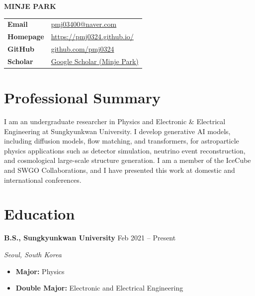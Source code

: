 \documentclass[11pt, a4paper]{article}
\newcommand{\experienceitem}[4]{
    \begin{tcolorbox}[
        colback=lightgray,
        colframe=primary,
        boxrule=0pt,
        leftrule=3pt,
        arc=0pt,
        left=5pt,
        right=5pt,
        top=5pt,
        bottom=5pt
    ]
    \textbf{\large #1} \hfill {\color{primary}#2}
    
    \textit{#3}
    
    #4
    \end{tcolorbox}
    \vspace{3pt}
}
\begin{document}
\vspace{-6pt}

{\Huge\bfseries\color{primary} MINJE PARK}

\vspace{4pt}
\noindent
\begin{tabularx}{\textwidth}{@{}>{\bfseries}p{}X@{}}
Email &
\href{mailto:pmj03400@naver.com}{pmj03400@naver.com} \\
Homepage &
\href{https://pmj0324.github.io/}{https://pmj0324.github.io/} \\
GitHub &
\href{https://github.com/pmj0324}{github.com/pmj0324} \\
Scholar &
\href{https://scholar.google.com/citations?user=oC5mE0AAAAAJ}{Google Scholar (Minje Park)} \\
\end{tabularx}

\vspace{2pt}

\section{Professional Summary}

\vspace{3pt}

I am an undergraduate researcher in Physics and Electronic \& Electrical Engineering at Sungkyunkwan University. I develop generative AI models, including diffusion models, flow matching, and transformers, for astroparticle physics applications such as detector simulation, neutrino event reconstruction, and cosmological large-scale structure generation. I am a member of the IceCube and SWGO Collaborations, and I have presented this work at domestic and international conferences.

\section{Education}
\experienceitem{B.S., Sungkyunkwan University}{Feb 2021 -- Present}{Seoul, South Korea}{
    \begin{itemize}[leftmargin=*, itemsep=2pt]
        \item \textbf{Major:} Physics
        \item \textbf{Double Major:} Electronic and Electrical Engineering
    \end{itemize}
}

\end{document}
